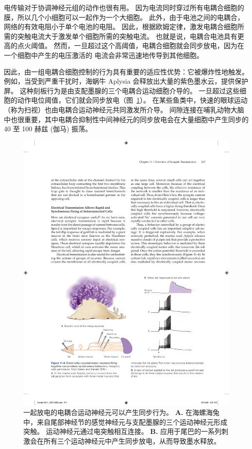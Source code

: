 电传输对于协调神经元组的动作也很有用。
因为电流同时穿过所有电耦合细胞的膜，所以几个小细胞可以一起作为一个大细胞。
此外，由于电池之间的电耦合，网络的有效电阻小于单个电池的电阻。
因此，根据欧姆定律，激发电耦合细胞所需的突触电流大于激发单个细胞所需的突触电流。
也就是说，电耦合电池具有更高的点火阈值。
然而，一旦超过这个高阈值，电耦合细胞就会同步放电，因为在一个细胞中产生的电压激活的  电流会非常迅速地传导到其他细胞。


因此，由一组电耦合细胞控制的行为具有重要的适应性优势：它被爆炸性地触发。
例如，当受到严重干扰时，海蜗牛 Aplysia 会释放出大量的紫色墨水云，提供保护屏。
这种刻板行为是由支配墨腺的三个电耦合运动细胞介导的。 一旦超过这些细胞的动作电位阈值，它们就会同步放电（图~\ref{fig:11_6}）。
在某些鱼类中，快速的眼球运动（称为扫视）也由电耦合运动神经元共同激发所介导。
间隙连接在哺乳动物大脑中也很重要，其中电耦合抑制性中间神经元的同步放电会在大量细胞中产生同步的 40 至 100 赫兹 (伽马) 振荡。


\begin{figure}[htbp]
	\centering
	\includegraphics[width=0.8\linewidth]{chap11/fig_11_6}
	\caption{一起放电的电耦合运动神经元可以产生同步行为\cite{carew1976two}。 
		\textbf{A.} 在海螺海兔中，来自尾部神经节的感觉神经元与支配墨腺的三个运动神经元形成突触。
		运动神经元通过电突触相互连接。
		\textbf{B.} 应用于尾巴的一系列刺激会在所有三个运动神经元中产生同步放电，从而导致墨水释放。}
	\label{fig:11_6}
\end{figure}


